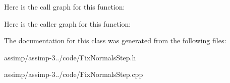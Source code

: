 Here is the call graph for this function\+:




Here is the caller graph for this function\+:




The documentation for this class was generated from the following files\+:\begin{DoxyCompactItemize}
\item 
assimp/assimp-\/3../code/Fix\+Normals\+Step.\+h\item 
assimp/assimp-\/3../code/Fix\+Normals\+Step.\+cpp\end{DoxyCompactItemize}
